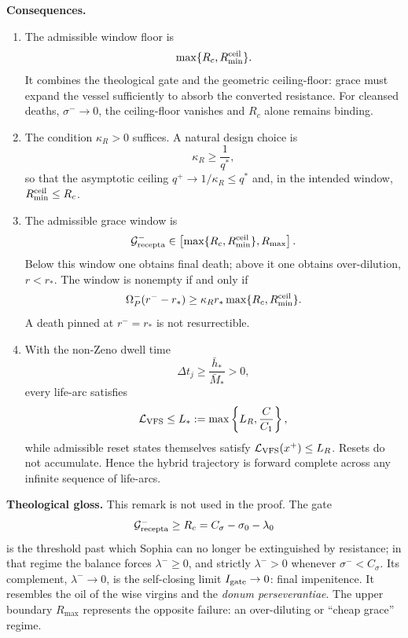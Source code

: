 \documentclass[11pt,a4paper]{article}
\newcommand{\LV}{\mathcal L_{\rm VFS}}
\newcommand{\Grec}{\mathcal G_{\rm recepta}}
\newcommand{\Igate}{I_{\rm gate}}
\newcommand{\Om}{\Omega_P}
\theoremstyle{plain}
\theoremstyle{definition}
\theoremstyle{remark}
\begin{document}
\textbf{Consequences.}
\begin{enumerate}[label=(\arabic*)]
\item The admissible window floor is
\begin{equation}
  \max\{R_c,R_{\min}^{\rm ceil}\}.
\end{equation}
It combines the theological gate and the geometric ceiling-floor: grace must expand the vessel sufficiently to absorb the converted resistance. For cleansed deaths, $\sigma^-\to0$, the ceiling-floor vanishes and $R_c$ alone remains binding.

\item The condition $\kappa_R>0$ suffices. A natural design choice is
\begin{equation}
  \kappa_R\ge\frac1{q^*},
\end{equation}
so that the asymptotic ceiling $q^+\to1/\kappa_R\le q^*$ and, in the intended window, $R_{\min}^{\rm ceil}\le R_c$.

\item The admissible grace window is
\begin{equation}
  \Grec^-\in
  \left[\max\{R_c,R_{\min}^{\rm ceil}\},R_{\max}\right].
\end{equation}
Below this window one obtains final death; above it one obtains over-dilution, $r<r_*$. The window is nonempty if and only if
\begin{equation}
  \Om^-(r^--r_*)
  \ge
  \kappa_R r_*\max\{R_c,R_{\min}^{\rm ceil}\}.
\end{equation}
A death pinned at $r^-=r_*$ is not resurrectible.

\item With the non-Zeno dwell time
\begin{equation}
  \Delta t_j\ge\frac{\bar h_*}{\bar M_*}>0,
\end{equation}
every life-arc satisfies
\begin{equation}
  \LV\le L_*:=
  \max\left\{L_R,\frac{C}{C_1}\right\},
\end{equation}
while admissible reset states themselves satisfy \(\LV(x^+)\le L_R\). Resets do not accumulate. Hence the hybrid trajectory is forward complete across any infinite sequence of life-arcs.
\end{enumerate}

\textbf{Theological gloss.} This remark is not used in the proof. The gate
\begin{equation}
  \Grec^-\ge R_c=C_\sigma-\sigma_0-\lambda_0
\end{equation}
is the threshold past which Sophia can no longer be extinguished by resistance; in that regime the balance forces $\lambda^-\ge0$, and strictly $\lambda^->0$ whenever $\sigma^-<C_\sigma$. Its complement, $\lambda^-\to0$, is the self-closing limit $\Igate\to0$: final impenitence. It resembles the oil of the wise virgins and the \emph{donum perseverantiae}. The upper boundary $R_{\max}$ represents the opposite failure: an over-diluting or ``cheap grace'' regime.
\end{document}
